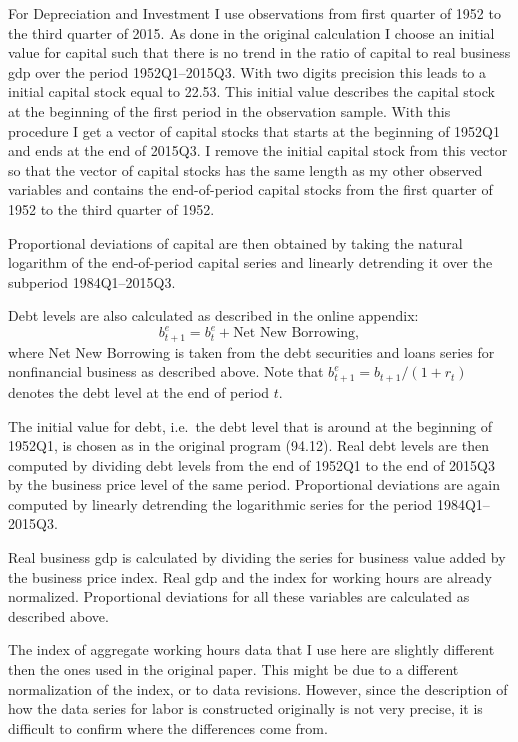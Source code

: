 For Depreciation and Investment I use observations from first quarter of 1952
to the third quarter of 2015. As done in the original calculation I choose an
initial value for capital such that there is no trend in the ratio of capital
to real business gdp over the period 1952Q1--2015Q3. With two digits precision
this leads to a initial capital stock equal to 22.53. This initial value
describes the capital stock at the beginning of the first period in the
observation sample. With this procedure I get a vector of capital stocks that
starts at the beginning of 1952Q1 and ends at the end of 2015Q3. I remove the
initial capital stock from this vector so that the vector of capital stocks has
the same length as my other observed variables and contains the end-of-period
capital stocks from the first quarter of 1952 to the third quarter of 1952.

Proportional deviations of capital are then obtained by taking the natural
logarithm of the end-of-period capital series and linearly detrending it over
the subperiod 1984Q1--2015Q3.

Debt levels are also calculated as described in the online appendix:
\begin{equation}
    b_{t+1}^e = b_t^e + \text{Net New Borrowing},
\end{equation}
where Net New Borrowing is taken from the debt securities and loans series for
nonfinancial business as described above. Note that
\( b^{e}_{t+1} = b_{t+1} / (1 + r_t) \) denotes the debt level at the end of
period \(t\).

The initial value for debt, i.e.\ the debt level that is around at the
beginning of 1952Q1, is chosen as in the original program
(94.12). Real debt levels are then computed by dividing debt levels from the
end of 1952Q1 to the end of 2015Q3 by the business price level of the same
period. Proportional deviations are again computed by linearly detrending the
logarithmic series for the period 1984Q1--2015Q3.

Real business gdp is calculated by dividing the series for business value added
by the business price index. Real gdp and the index for working hours are
already normalized. Proportional deviations for all these variables are
calculated as described above.

The index of aggregate working hours data that I use here are slightly
different then the ones used in the original paper. This might be due to a
different normalization of the index, or to data revisions. However, since the
description of how the data series for labor is constructed originally is not
very precise, it is difficult to confirm where the differences come from.

